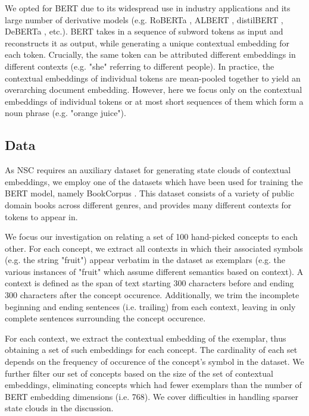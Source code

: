 We opted for BERT due to its widespread use in industry applications and its large number of derivative models (e.g. RoBERTa \citep{liu_roberta_2019}, ALBERT \citep{lan_albert_2020}, distilBERT \citep{sanh_distilbert_2020}, DeBERTa \citep{he_deberta_2021}, etc.). BERT takes in a sequence of subword tokens as input and reconstructs it as output, while generating a unique contextual embedding for each token. Crucially, the same token can be attributed different embeddings in different contexts (e.g. "she" referring to different people). In practice, the contextual embeddings of individual tokens are mean-pooled together to yield an overarching document embedding. However, here we focus only on the contextual embeddings of individual tokens or at most short sequences of them which form a noun phrase (e.g. "orange juice").

\subsection{Data}

As NSC requires an auxiliary dataset for generating state clouds of contextual embeddings, we employ one of the datasets which have been used for training the BERT model, namely BookCorpus \citep{devlin_bert_nodate}. This dataset consists of a variety of public domain books across different genres, and provides many different contexts for tokens to appear in.

We focus our investigation on relating a set of 100 hand-picked concepts to each other. For each concept, we extract all contexts in which their associated symbols (e.g. the string "fruit") appear verbatim in the dataset as exemplars (e.g. the various instances of "fruit" which assume different semantics based on context). A context is defined as the span of text starting 300 characters before and ending 300 characters after the concept occurence. Additionally, we trim the incomplete beginning and ending sentences (i.e. trailing) from each context, leaving in only complete sentences surrounding the concept occurence.

For each context, we extract the contextual embedding of the exemplar, thus obtaining a set of such embeddings for each concept. The cardinality of each set depends on the frequency of occurence of the concept's symbol in the dataset. We further filter our set of concepts based on the size of the set of contextual embeddings, eliminating concepts which had fewer exemplars than the number of BERT embedding dimensions (i.e. 768). We cover difficulties in handling sparser state clouds in the discussion.

